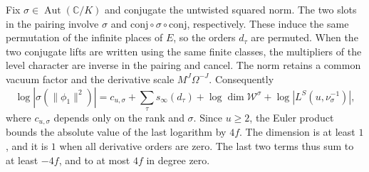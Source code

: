 Fix \(\sigma\in\operatorname{Aut}(\mathbb C/K)\) and conjugate the
untwisted squared norm. The two slots in the pairing involve
\(\sigma\) and \(\mathrm{conj}\circ\sigma\circ\mathrm{conj}\),
respectively. These induce the same permutation of the infinite
places of \(E\), so the orders \(d_\tau\) are permuted.
When the two conjugate lifts are written using the same finite
classes, the multipliers of the level character are inverse in
the pairing and cancel. The norm retains a common vacuum factor
and the derivative scale \(M^J\Omega^{-J}\). Consequently
\[
 \log|\sigma(\|\phi_1\|^2)|
   =c_{u,\sigma}+\sum_\tau s_\infty(d_\tau)+
      \log\dim\mathcal W^\sigma+\log|L^S(u,\nu_\sigma^{-1})|,
\]
where \(c_{u,\sigma}\) depends only on the rank and \(\sigma\).
Since \(u\ge2\), the Euler product bounds the absolute value of the
last logarithm by \(4f\). The dimension is at least \(1\), and it is
\(1\) when all derivative orders are zero. The last two terms
thus sum to at least \(-4f\), and to at most \(4f\) in degree zero.
